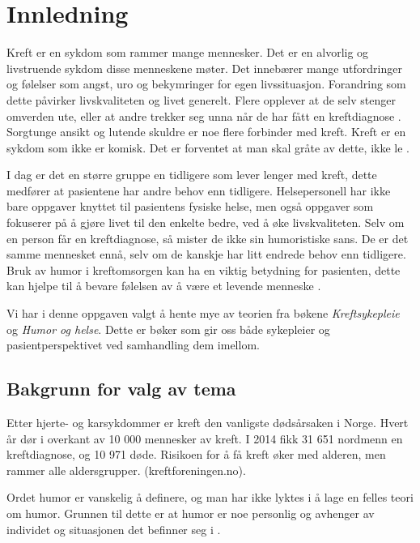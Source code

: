 \chapter{Innledning}

Kreft er en sykdom som rammer mange mennesker. Det er en alvorlig og
livstruende sykdom disse menneskene møter. Det innebærer mange utfordringer og
følelser som angst, uro og bekymringer for egen livssituasjon. Forandring som
dette påvirker livskvaliteten og livet generelt. Flere opplever at de selv
stenger omverden ute, eller at andre trekker seg unna når de har fått en
kreftdiagnose \cite[s.~39-47]{rustoen2008}. Sorgtunge ansikt og lutende skuldre
er noe flere forbinder med kreft. Kreft er en sykdom som ikke er komisk. Det er
forventet at man skal gråte av dette, ikke le \cite[s.~161-162]{tyrdal2002}.

I dag er det en større gruppe en tidligere som lever lenger med kreft, dette
medfører at pasientene har andre behov enn tidligere. Helsepersonell har ikke
bare oppgaver knyttet til pasientens fysiske helse, men også oppgaver som
fokuserer på å gjøre livet til den enkelte bedre, ved å øke livskvaliteten.
Selv om en person får en kreftdiagnose, så mister de ikke sin humoristiske
sans. De er det samme mennesket ennå, selv om de kanskje har litt endrede behov
enn tidligere. Bruk av humor i kreftomsorgen kan ha en viktig betydning for
pasienten, dette kan hjelpe til å bevare følelsen av å være et levende menneske
\cite[s.~163]{tyrdal2002}.

Vi har i denne oppgaven valgt å hente mye av teorien fra bøkene
\textit{Kreftsykepleie} og \textit{Humor og helse}. Dette er bøker som gir oss
både sykepleier og pasientperspektivet ved samhandling dem imellom.

\section{Bakgrunn for valg av tema}

Etter hjerte- og karsykdommer er kreft den vanligste dødsårsaken i Norge. Hvert
år dør i overkant av 10 000 mennesker av kreft. I 2014 fikk 31 651 nordmenn en
kreftdiagnose, og 10 971 døde. Risikoen for å få kreft
øker med alderen, men rammer alle aldersgrupper.
(kreftforeningen.no).

Ordet humor er vanskelig å definere, og man har ikke lyktes i å lage en felles
teori om humor. Grunnen til dette er at humor er noe personlig og avhenger av
individet og situasjonen det befinner seg i \cite{tyrdal2002}.

